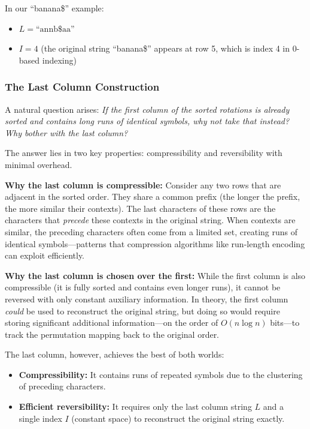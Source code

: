 In our ``banana\$'' example:
\begin{itemize}
    \item \(L = \text{``annb\$aa''}\)
    \item \(I = 4\) (the original string ``banana\$'' appears at row 5, which is index 4 in 0-based indexing)
\end{itemize}

\subsubsection{The Last Column Construction}

A natural question arises: \emph{If the first column of the sorted rotations is already sorted and contains long runs of identical symbols, why not take that instead? Why bother with the last column?}

The answer lies in two key properties: compressibility and reversibility with minimal overhead.

\textbf{Why the last column is compressible:} Consider any two rows that are adjacent in the sorted order. They share a common prefix (the longer the prefix, the more similar their contexts). The last characters of these rows are the characters that \emph{precede} these contexts in the original string. When contexts are similar, the preceding characters often come from a limited set, creating runs of identical symbols—patterns that compression algorithms like run-length encoding can exploit efficiently.

\textbf{Why the last column is chosen over the first:} While the first column is also compressible (it is fully sorted and contains even longer runs), it cannot be reversed with only constant auxiliary information. In theory, the first column \emph{could} be used to reconstruct the original string, but doing so would require storing significant additional information—on the order of \(O(n \log n)\) bits—to track the permutation mapping back to the original order.

The last column, however, achieves the best of both worlds:
\begin{itemize}
    \item \textbf{Compressibility:} It contains runs of repeated symbols due to the clustering of preceding characters.
    \item \textbf{Efficient reversibility:} It requires only the last column string \(L\) and a single index \(I\) (constant space) to reconstruct the original string exactly.
\end{itemize}

